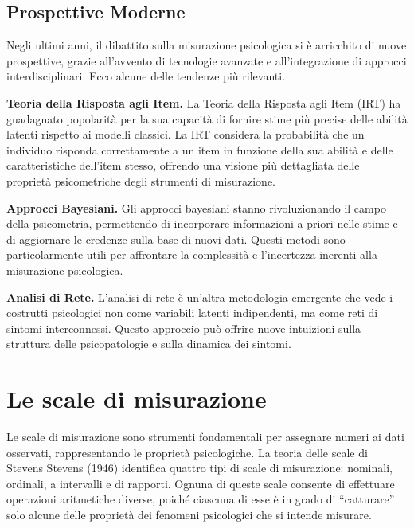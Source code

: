 \documentclass[
  letterpaper,
  krantz2]{{[}./krantz{]}}
\begin{document}
\subsection{Prospettive Moderne}\label{prospettive-moderne}

Negli ultimi anni, il dibattito sulla misurazione psicologica si è
arricchito di nuove prospettive, grazie all'avvento di tecnologie
avanzate e all'integrazione di approcci interdisciplinari. Ecco alcune
delle tendenze più rilevanti.

\textbf{Teoria della Risposta agli Item.} La Teoria della Risposta agli
Item (IRT) ha guadagnato popolarità per la sua capacità di fornire stime
più precise delle abilità latenti rispetto ai modelli classici. La IRT
considera la probabilità che un individuo risponda correttamente a un
item in funzione della sua abilità e delle caratteristiche dell'item
stesso, offrendo una visione più dettagliata delle proprietà
psicometriche degli strumenti di misurazione.

\textbf{Approcci Bayesiani.} Gli approcci bayesiani stanno
rivoluzionando il campo della psicometria, permettendo di incorporare
informazioni a priori nelle stime e di aggiornare le credenze sulla base
di nuovi dati. Questi metodi sono particolarmente utili per affrontare
la complessità e l'incertezza inerenti alla misurazione psicologica.

\textbf{Analisi di Rete.} L'analisi di rete è un'altra metodologia
emergente che vede i costrutti psicologici non come variabili latenti
indipendenti, ma come reti di sintomi interconnessi. Questo approccio
può offrire nuove intuizioni sulla struttura delle psicopatologie e
sulla dinamica dei sintomi.

\section{Le scale di misurazione}\label{le-scale-di-misurazione}

Le scale di misurazione sono strumenti fondamentali per assegnare numeri
ai dati osservati, rappresentando le proprietà psicologiche. La teoria
delle scale di Stevens Stevens (1946) identifica quattro tipi di scale
di misurazione: nominali, ordinali, a intervalli e di rapporti. Ognuna
di queste scale consente di effettuare operazioni aritmetiche diverse,
poiché ciascuna di esse è in grado di ``catturare'' solo alcune delle
proprietà dei fenomeni psicologici che si intende misurare.
\end{document}
